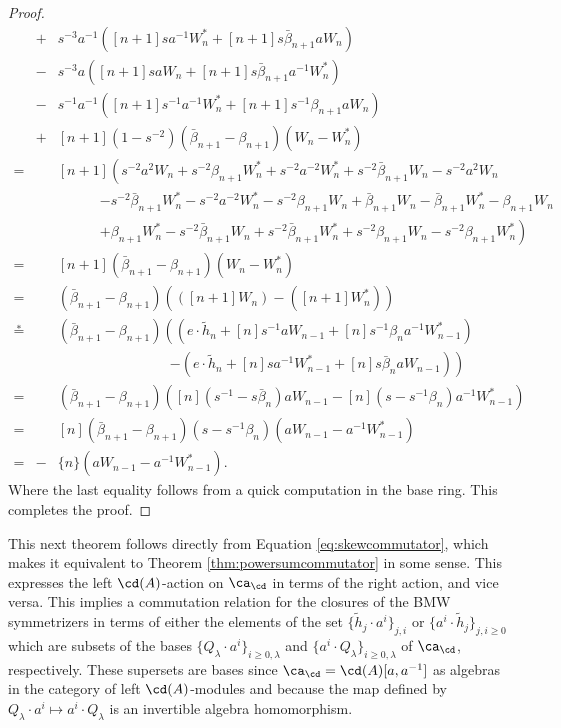\begin{proof}
\begin{eqnarray*}
&+& s^{-3}a^{-1}\left( [n+1]sa^{-1}W^*_n + [n+1]s\bar{\beta}_{n+1}aW_n \right) \\
&-&s^{-3}a\left( [n+1]saW_n + [n+1]s\bar{\beta}_{n+1}a^{-1}W^*_n \right) \\
&-& s^{-1}a^{-1}\left( [n+1]s^{-1}a^{-1}W^*_n + [n+1]s^{-1}\beta_{n+1}aW_n \right) \\
&+& [n+1]\left(1-s^{-2} \right) \left( \bar{\beta}_{n+1} - \beta_{n+1} \right) \left( W_n - W^*_n \right)\\
=&& [n+1]\left( s^{-2}a^2W_n + s^{-2}\beta_{n+1}W^*_n + s^{-2}a^{-2}W^*_n + s^{-2}\bar{\beta}_{n+1}W_n - s^{-2}a^{2}W_n \right. \\
&&\qquad\quad \left. - s^{-2}\bar{\beta}_{n+1}W^*_n - s^{-2}a^{-2}W^*_n - s^{-2}\beta_{n+1}W_n + \bar{\beta}_{n+1}W_n - \bar{\beta}_{n+1}W^*_n - \beta_{n+1}W_n \right. \\
&&\qquad\quad \left. + \beta_{n+1}W^*_n - s^{-2}\bar{\beta}_{n+1}W_n + s^{-2}\bar{\beta}_{n+1}W^*_n + s^{-2}\beta_{n+1}W_n - s^{-2}\beta_{n+1}W^*_n \right) \\
=&& [n+1]\left( \bar{\beta}_{n+1} - \beta_{n+1} \right) \left( W_n - W^*_n \right) \\
=&& \left( \bar{\beta}_{n+1} - \beta_{n+1} \right) \left( \left( [n+1]W_n \right) - \left( [n+1]W^*_n \right) \right) \\
\overset{\ast}{=}&& \left( \bar{\beta}_{n+1} - \beta_{n+1} \right) \left( \left( e \cdot \tilde{h}_{n} + [n]s^{-1}aW_{n-1} + [n]s^{-1}\beta_{n}a^{-1}W^*_{n-1} \right) \right. \\
&& \qquad\qquad\qquad\qquad \left. -\left( e \cdot \tilde{h}_{n} + [n]sa^{-1}W^*_{n-1} + [n]s\bar{\beta}_{n}aW_{n-1} \right) \right) \\
=&& \left( \bar{\beta}_{n+1} - \beta_{n+1} \right) \left( [n]\left( s^{-1} - s\bar{\beta}_{n} \right) aW_{n-1} - [n]\left( s-s^{-1}\beta_{n} \right) a^{-1}W^*_{n-1} \right) \\
=&& [n]\left(\bar{\beta}_{n+1} - \beta_{n+1} \right) \left( s - s^{-1}\beta_{n} \right) \left( aW_{n-1} - a^{-1}W^*_{n-1} \right) \\
=&-& \{n\}\left( aW_{n-1} - a^{-1}W^*_{n-1} \right).
\end{eqnarray*}
Where the last equality follows from a quick computation in the base ring. This completes the proof.
\end{proof}

This next theorem follows directly from Equation \eqref{eq:skewcommutator}, which makes it equivalent to Theorem \ref{thm:powersumcommutator} in some sense. This expresses the left $\cd(A)$-action on $\ca_\cd$ in terms of the right action, and vice versa. This implies a commutation relation for the closures of the BMW symmetrizers in terms of either the elements of the set $\{\tilde{h}_j \cdot a^i \}_{j, i}$ or $\{ a^i \cdot \tilde{h}_j \}_{j, i \geq 0}$ which are subsets of the bases $\{ Q_\lambda \cdot a^i \}_{i \geq 0, \lambda}$ and $\{ a^i \cdot Q_\lambda \}_{i \geq 0, \lambda}$ of $\ca_\cd$, respectively. These supersets are bases since $\ca_\cd = \cd(A)[a, a^{-1}]$ as algebras in the category of left $\cd(A)$-modules and because the map defined by $Q_\lambda \cdot a^i \mapsto a^i \cdot Q_\lambda$ is an invertible algebra homomorphism. 

